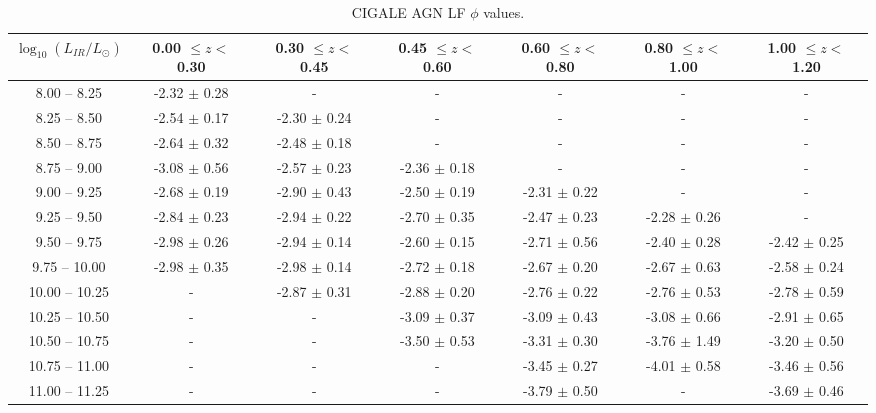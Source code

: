 \begin{table*}
    \begin{center}
    \caption{CIGALE AGN LF $\phi$ values.}
    \label{Tab: CG AGN LF}
    \begin{tabular}{@{}ccccccc@{}}
        \toprule
        $\log_{10}(L_{IR}/L_{\odot})$ & 0.00 $\leq z <$ 0.30 & 0.30 $\leq z <$ 0.45 & 0.45 $\leq z <$ 0.60 & 0.60 $\leq z <$ 0.80 & 0.80 $\leq z <$ 1.00 & 1.00 $\leq z <$ 1.20 \\
        \hline
         8.00 --  8.25 & -2.32 $\pm$ 0.28 & -                & -                & -                & -                & - \\
         8.25 --  8.50 & -2.54 $\pm$ 0.17 & -2.30 $\pm$ 0.24 & -                & -                & -                & - \\
         8.50 --  8.75 & -2.64 $\pm$ 0.32 & -2.48 $\pm$ 0.18 & -                & -                & -                & - \\
         8.75 --  9.00 & -3.08 $\pm$ 0.56 & -2.57 $\pm$ 0.23 & -2.36 $\pm$ 0.18 & -                & -                & - \\
         9.00 --  9.25 & -2.68 $\pm$ 0.19 & -2.90 $\pm$ 0.43 & -2.50 $\pm$ 0.19 & -2.31 $\pm$ 0.22 & -                & - \\
         9.25 --  9.50 & -2.84 $\pm$ 0.23 & -2.94 $\pm$ 0.22 & -2.70 $\pm$ 0.35 & -2.47 $\pm$ 0.23 & -2.28 $\pm$ 0.26 & - \\
         9.50 --  9.75 & -2.98 $\pm$ 0.26 & -2.94 $\pm$ 0.14 & -2.60 $\pm$ 0.15 & -2.71 $\pm$ 0.56 & -2.40 $\pm$ 0.28 & -2.42 $\pm$ 0.25 \\
         9.75 -- 10.00 & -2.98 $\pm$ 0.35 & -2.98 $\pm$ 0.14 & -2.72 $\pm$ 0.18 & -2.67 $\pm$ 0.20 & -2.67 $\pm$ 0.63 & -2.58 $\pm$ 0.24 \\
        10.00 -- 10.25 & -                & -2.87 $\pm$ 0.31 & -2.88 $\pm$ 0.20 & -2.76 $\pm$ 0.22 & -2.76 $\pm$ 0.53 & -2.78 $\pm$ 0.59 \\
        10.25 -- 10.50 & -                & -                & -3.09 $\pm$ 0.37 & -3.09 $\pm$ 0.43 & -3.08 $\pm$ 0.66 & -2.91 $\pm$ 0.65 \\
        10.50 -- 10.75 & -                & -                & -3.50 $\pm$ 0.53 & -3.31 $\pm$ 0.30 & -3.76 $\pm$ 1.49 & -3.20 $\pm$ 0.50 \\
        10.75 -- 11.00 & -                & -                & -                & -3.45 $\pm$ 0.27 & -4.01 $\pm$ 0.58 & -3.46 $\pm$ 0.56 \\
        11.00 -- 11.25 & -                & -                & -                & -3.79 $\pm$ 0.50 & -                & -3.69 $\pm$ 0.46 \\

\end{tabular}
\end{center}
\end{table*}
